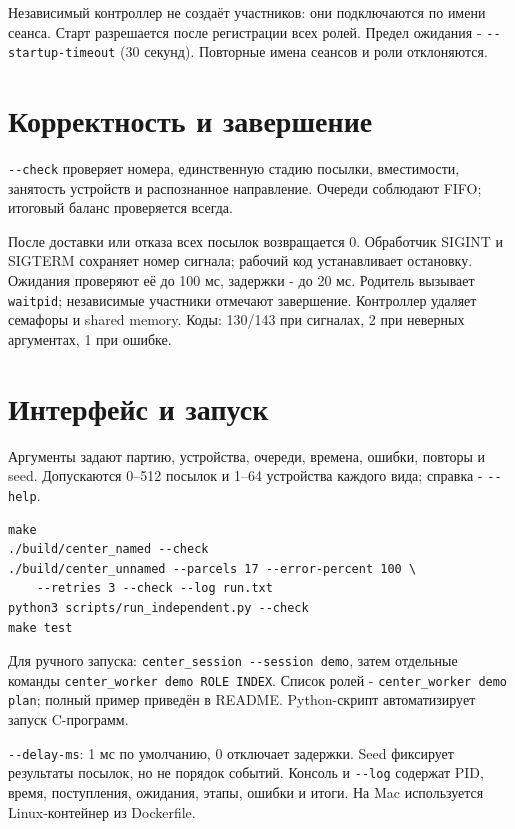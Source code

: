Независимый контроллер не создаёт участников: они подключаются по имени сеанса. Старт разрешается после регистрации всех ролей. Предел ожидания - \texttt{-{}-startup-timeout} (30 секунд). Повторные имена сеансов и роли отклоняются.

\section{Корректность и завершение}
\texttt{-{}-check} проверяет номера, единственную стадию посылки, вместимости, занятость устройств и распознанное направление. Очереди соблюдают FIFO; итоговый баланс проверяется всегда.

После доставки или отказа всех посылок возвращается 0. Обработчик SIGINT и SIGTERM сохраняет номер сигнала; рабочий код устанавливает остановку. Ожидания проверяют её до 100 мс, задержки - до 20 мс. Родитель вызывает \texttt{waitpid}; независимые участники отмечают завершение. Контроллер удаляет семафоры и shared memory. Коды: 130/143 при сигналах, 2 при неверных аргументах, 1 при ошибке.

\clearpage
\section{Интерфейс и запуск}
Аргументы задают партию, устройства, очереди, времена, ошибки, повторы и seed. Допускаются 0--512 посылок и 1--64 устройства каждого вида; справка - \texttt{-{}-help}.
\begin{lstlisting}
make
./build/center_named --check
./build/center_unnamed --parcels 17 --error-percent 100 \
    --retries 3 --check --log run.txt
python3 scripts/run_independent.py --check
make test
\end{lstlisting}

Для ручного запуска: \texttt{center\_session -{}-session demo}, затем отдельные команды \texttt{center\_worker demo ROLE INDEX}. Список ролей - \texttt{center\_worker demo plan}; полный пример приведён в README. Python-скрипт автоматизирует запуск C-программ.

\texttt{-{}-delay-ms}: 1 мс по умолчанию, 0 отключает задержки. Seed фиксирует результаты посылок, но не порядок событий. Консоль и \texttt{-{}-log} содержат PID, время, поступления, ожидания, этапы, ошибки и итоги. На Mac используется Linux-контейнер из Dockerfile.


